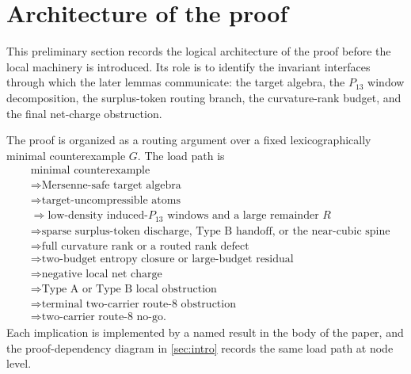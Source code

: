 \documentclass[11pt]{article}
\begin{document}
\begin{abstract}
The route-8 residual is quantified: if it carries the large-budget charge deficit,
it contains linearly many unpaid silent target-complete-minimal trace-basin
entries, counted by their routed vertices.  The carrier ledger passes each entry
to its canonical minimal target-complete carrier core inside the declared
$u$-supported response algebra, closes zero/one-essential-core entries by exits
(4)--(7), and reduces any surviving large-budget route-8 branch to a
two-carrier route-8 entry.  The terminal obstruction is then isolated as a
single local no-go theorem, \cref{thm:typeA-two-carrier-nogo}, with the
carrier-deletion witnesses recorded as part of the residual data.  All numerical
constants are displayed explicitly, and the finite curvature enumerations are
reproduced, with code, in an appendix.
\end{abstract}

\tableofcontents

\setcounter{section}{-1}
\section{Architecture of the proof}\label{sec:architecture}

This preliminary section records the logical architecture of the proof before
the local machinery is introduced.  Its role is to
identify the invariant interfaces through which the later lemmas communicate:
the target algebra, the $P_{13}$ window decomposition, the surplus-token
routing branch, the curvature-rank budget, and the final net-charge
obstruction.

The proof is organized as a routing argument over a fixed lexicographically minimal
counterexample $G$.  The load path is
\[
\begin{aligned}
&\text{minimal counterexample}\\
&\Rightarrow \text{Mersenne-safe target algebra}\\
&\Rightarrow \text{target-uncompressible atoms}\\
&\Rightarrow \text{low-density induced-}P_{13}\text{ windows and a large remainder }R\\
&\Rightarrow \text{sparse surplus-token discharge, Type B handoff, or the near-cubic spine}\\
&\Rightarrow \text{full curvature rank or a routed rank defect}\\
&\Rightarrow \text{two-budget entropy closure or large-budget residual}\\
&\Rightarrow \text{negative local net charge}\\
&\Rightarrow \text{Type A or Type B local obstruction}\\
&\Rightarrow \text{terminal two-carrier route-8 obstruction}\\
&\Rightarrow \text{two-carrier route-8 no-go.}
\end{aligned}
\]
Each implication is implemented by a named result in the body of the paper, and
the proof-dependency diagram in \cref{sec:intro} records the same load path at
node level.
\end{document}
